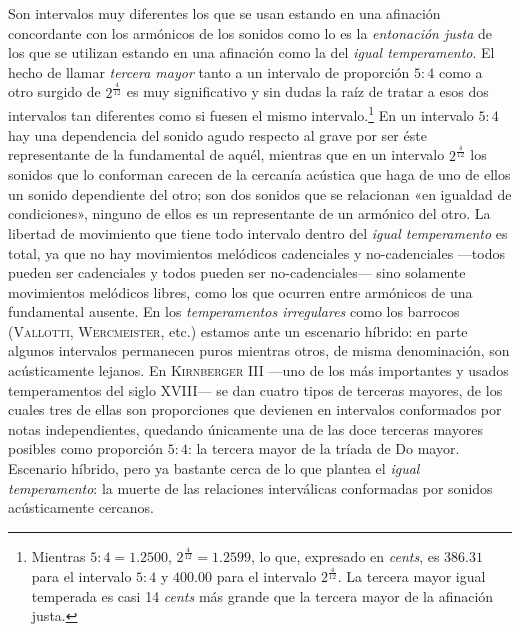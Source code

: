 \documentclass[a4paper,12pt]{article}
\begin{document}
\begin{multicols}{2}
  Son intervalos muy diferentes los que se usan estando en una afinación concordante con los armónicos de los sonidos como lo es la \emph{entonación justa} de los que se utilizan estando en una afinación como la del \emph{igual temperamento}. El hecho de llamar \emph{tercera mayor} tanto a un intervalo de proporción $5:4$ como a otro surgido de $2^{\frac{4}{12}}$ es muy significativo y sin dudas la raíz de tratar a esos dos intervalos tan diferentes como si fuesen el mismo intervalo.\footnote{Mientras $5:4=1.2500$, $2^{\frac{4}{12}}=1.2599$, lo que, expresado en \emph{cents}, es $386.31$ para el intervalo $5:4$ y $400.00$ para el intervalo $2^{\frac{4}{12}}$. La tercera mayor igual temperada es casi 14 \emph{cents} más grande que la tercera mayor de la afinación justa.} En un intervalo $5:4$ hay una dependencia del sonido agudo respecto al grave por ser éste representante de la fundamental de aquél, mientras que en un intervalo $2^{\frac{4}{12}}$ los sonidos que lo conforman carecen de la cercanía acústica que haga de uno de ellos un sonido dependiente del otro; son dos sonidos que se relacionan «en igualdad de condiciones», ninguno de ellos es un representante de un armónico del otro. La libertad de movimiento que tiene todo intervalo dentro del \emph{igual temperamento} es total, ya que no hay movimientos melódicos cadenciales y no-cadenciales ---todos pueden ser cadenciales y todos pueden ser no-cadenciales--- sino solamente movimientos melódicos libres, como los que ocurren entre armónicos de una fundamental ausente. En los \emph{temperamentos irregulares} como los barrocos (\textsc{Vallotti}, \textsc{Wercmeister}, etc.) estamos ante un escenario híbrido: en parte algunos intervalos permanecen puros mientras otros, de misma denominación, son acústicamente lejanos. En \textsc{Kirnberger III} ---uno de los más importantes y usados temperamentos del siglo XVIII--- se dan cuatro tipos de terceras mayores, de los cuales tres de ellas son proporciones que devienen en intervalos conformados por notas independientes, quedando únicamente una de las doce terceras mayores posibles como proporción $5:4$: la tercera mayor de la tríada de Do mayor. Escenario híbrido, pero ya bastante cerca de lo que plantea el \emph{igual temperamento}: la muerte de las relaciones interválicas conformadas por sonidos acústicamente cercanos.
\end{multicols}
\end{document}

